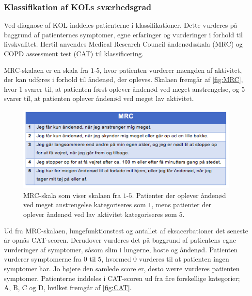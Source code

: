 \subsubsection{Klassifikation af KOLs sværhedsgrad}
Ved diagnose af KOL inddeles patienterne i klassifikationer. Dette vurderes på baggrund af patienternes symptomer, egne erfaringer og vurderinger i forhold til livskvalitet. Hertil anvendes Medical Research Council åndenødsskala (MRC) og COPD assessment test (CAT) til klassificering.\cite{Basisbogen2016}
 
MRC-skalaen er en skala fra $1$-$5$, hvor patienten vurderer mængden af aktivitet, der kan udføres i forhold til åndenød, der opleves. Skalaen fremgår af \autoref{fig:MRC}, hvor $1$ svarer til, at patienten først oplever åndenød ved meget anstrengelse, og $5$ svarer til, at patienten oplever åndenød ved meget lav aktivitet. \cite{Basisbogen2016}

\begin{figure} [H]
\centering
\includegraphics[width=1\textwidth]{figures/MRC}
\caption{MRC-skala som viser skalaen fra $1$-$5$. Patienter der oplever åndenød ved meget anstrengelse kategoriseres som $1$, mens patienter der oplever åndenød ved lav aktivitet kategoriseres som $5$.}
\label{fig:MRC}
\end{figure} 

\noindent
Ud fra MRC-skalaen, lungefunktionstest og antallet af eksacerbationer det seneste år opnås CAT-scoren. Derudover vurderes det på baggrund af patientens egne vurderinger af symptomer, såsom slim i lungerne, hoste og åndenød. Patienten vurderer symptomerne fra $0$ til $5$, hvormed $0$ vurderes til at patienten ingen symptomer har. Jo højere den samlede score er, desto værre vurderes patienten symptomer. \cite{Basisbogen2016, dsam2016} Patienterne inddeles i CAT-scoren ud fra fire forskellige kategorier; A, B, C og D, hvilket fremgår af \autoref{fig:CAT}.

